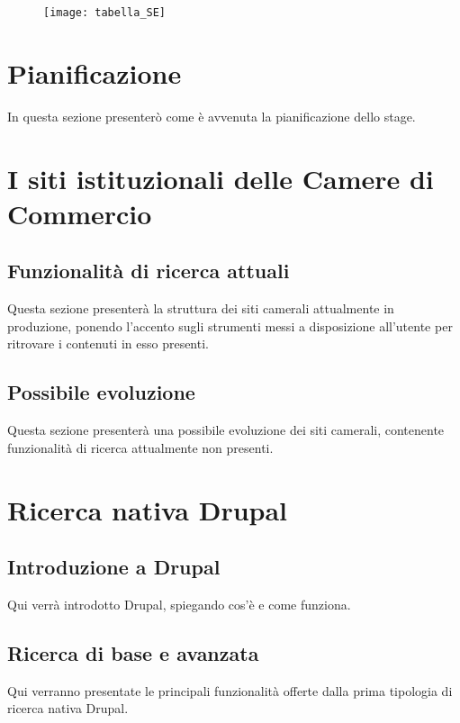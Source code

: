 	\begin{figure}[htbp]
		\begin{center}
			\texttt{[image: tabella\_SE]}
		\end{center}
	\end{figure}
	
	\section{Pianificazione}
	In questa sezione presenterò come è avvenuta la pianificazione dello stage.
	
	\section{I siti istituzionali delle Camere di Commercio}

		\subsection{Funzionalità di ricerca attuali}
		Questa sezione presenterà la struttura dei siti camerali attualmente in produzione, ponendo l'accento sugli strumenti messi a disposizione all'utente per ritrovare i contenuti in esso presenti.
		
		\subsection{Possibile evoluzione}
		Questa sezione presenterà una possibile evoluzione dei siti camerali, contenente funzionalità di ricerca attualmente non presenti.

	\section{Ricerca nativa Drupal}

		\subsection{Introduzione a Drupal}
		Qui verrà introdotto Drupal, spiegando cos'è e come funziona.
		
		\subsection{Ricerca di base e avanzata}
		Qui verranno presentate le principali funzionalità offerte dalla prima tipologia di ricerca nativa Drupal.
		
